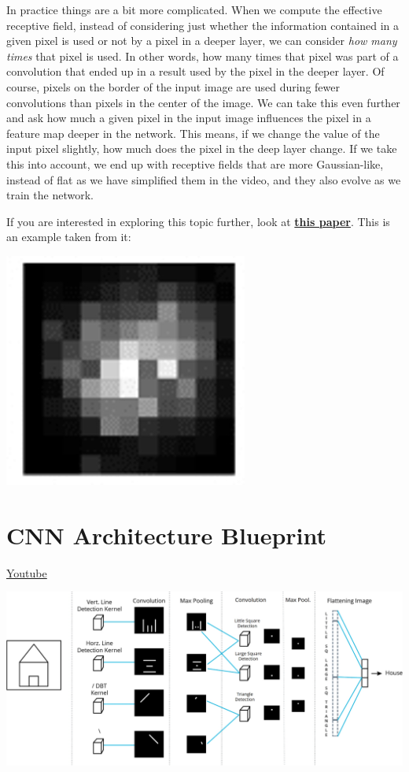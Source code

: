 In practice things are a bit more complicated. When we compute the effective receptive field, instead of considering just whether the information contained in a given pixel is used or not by a pixel in a deeper layer, we can consider \textit{how many times} that pixel is used. In other words, how many times that pixel was part of a convolution that ended up in a result used by the pixel in the deeper layer. Of course, pixels on the border of the input image are used during fewer convolutions than pixels in the center of the image. We can take this even further and ask how much a given pixel in the input image influences the pixel in a feature map deeper in the network. This means, if we change the value of the input pixel slightly, how much does the pixel in the deep layer change. If we take this into account, we end up with receptive fields that are more Gaussian-like, instead of flat as we have simplified them in the video, and they also evolve as we train the network.

If you are interested in exploring this topic further, look at \href{https://arxiv.org/abs/1701.04128}{\textbf{this paper}}. This is an example taken from it:

\includegraphics[width=0.25\linewidth]{img//cnn//concepts/efr.jpeg}

\section{CNN Architecture Blueprint}
\href{https://www.youtube.com/watch?v=U_v_7MR0WIQ&ab_channel=Udacity}{Youtube}

\includegraphics[width=1\linewidth]{img//cnn//concepts/cnn.jpeg}
\label{fig:CNNHouse}

